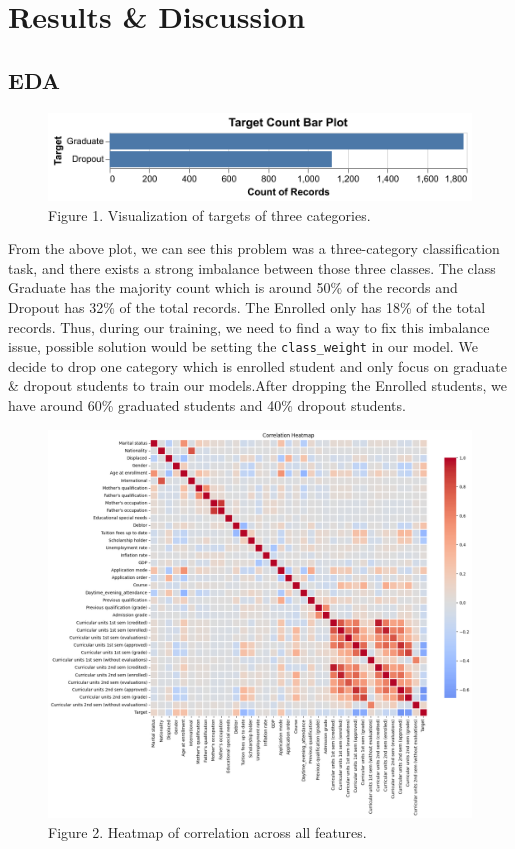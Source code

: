 \documentclass[
]{article}
\begin{document}
\hypertarget{results-discussion}{%
\section{Results \& Discussion}\label{results-discussion}}

\hypertarget{eda}{%
\subsection{EDA}\label{eda}}

\begin{figure}
\includegraphics[width=1\linewidth]{../results/target_count_bar_plot} \caption{Figure 1. Visualization of targets of three categories.}\label{fig:target_count_bar_plot}
\end{figure}

From the above plot, we can see this problem was a three-category
classification task, and there exists a strong imbalance between those
three classes. The class Graduate has the majority count which is around
50\% of the records and Dropout has 32\% of the total records. The
Enrolled only has 18\% of the total records. Thus, during our training,
we need to find a way to fix this imbalance issue, possible solution
would be setting the \texttt{class\_weight} in our model. We decide to
drop one category which is enrolled student and only focus on graduate
\& dropout students to train our models.After dropping the Enrolled
students, we have around 60\% graduated students and 40\% dropout
students.

\begin{figure}
\includegraphics[width=1\linewidth]{../results/correlation_heatmap_plot} \caption{Figure 2. Heatmap of correlation across all features.}\label{fig:correlation_heatmap_plot}
\end{figure}
\end{document}
